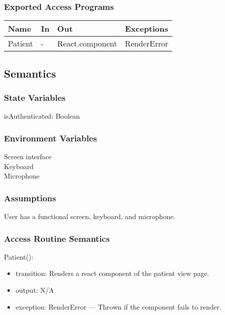 \documentclass[12pt, titlepage]{article}
\begin{document}
\subsubsection{Exported Access Programs}

\begin{center}
  \begin{tabular}{p{3cm} p{2cm} p{4cm} p{3cm}}
\hline
\textbf{Name} & \textbf{In} & \textbf{Out} & \textbf{Exceptions} \\
\hline
Patient & - & React.component & RenderError \\
\hline
\end{tabular}
\end{center}

\subsection{Semantics}

\subsubsection{State Variables}
isAuthenticated: Boolean

\subsubsection{Environment Variables}
Screen interface\\
Keyboard\\
Microphone\\

\subsubsection{Assumptions}
User has a functional screen, keyboard, and microphone.

\subsubsection{Access Routine Semantics}

\noindent Patient():
\begin{itemize}
\item transition: Renders a react component of the patient view page.
\item output: N/A
\item exception: RenderError — Thrown if the component fails to render.
\end{itemize}
\end{document}
